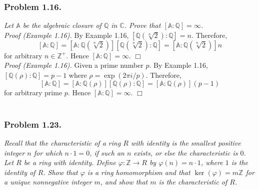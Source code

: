 \documentclass{article}
\begin{document}



\subsubsection*{Problem 1.16.}
\emph{Let $\mathbb{A}$ be the algebraic closure of $\mathbb{Q}$ in $\mathbb{C}$.
Prove that $[\mathbb{A}:\mathbb{Q}] = \infty$. } \\

\emph{Proof (Example 1.16).}
By Example 1.16, $[\mathbb{Q}(\sqrt[n]{2}):\mathbb{Q}] = n.$
Therefore,
$$[\mathbb{A}:\mathbb{Q}]
= [\mathbb{A}:\mathbb{Q}(\sqrt[n]{2})][\mathbb{Q}(\sqrt[n]{2}):\mathbb{Q}]
= [\mathbb{A}:\mathbb{Q}(\sqrt[n]{2})]n$$
for arbitrary $n \in \mathbb{Z}^+$.
Hence $[\mathbb{A}:\mathbb{Q}] = \infty$.
$\Box$ \\

\emph{Proof (Example 1.16).}
Given a prime number $p$.
By Example 1.16, $[\mathbb{Q}(\rho):\mathbb{Q}] = p-1$
where $\rho = \exp(2\pi i/p)$.
Therefore,
$$[\mathbb{A}:\mathbb{Q}]
= [\mathbb{A}:\mathbb{Q}(\rho)][\mathbb{Q}(\rho):\mathbb{Q}]
= [\mathbb{A}:\mathbb{Q}(\rho)](p-1)$$
for arbitrary prime $p$.
Hence $[\mathbb{A}:\mathbb{Q}] = \infty$.
$\Box$ \\\\






\subsubsection*{Problem 1.23.}
\emph{Recall that the characteristic of a ring $R$ with identity
is the smallest positive integer $n$ for which $n \cdot 1 = 0$,
if such an $n$ exists, or else the characteristic is $0$.
Let $R$ be a ring with identity.
Define $\varphi: \mathbb{Z} \rightarrow R$ by $\varphi(n) = n \cdot 1$,
where $1$ is the identity of $R$.
Show that $\varphi$ is a ring homomorphism
and that $\ker(\varphi) = m\mathbb{Z}$ for a unique nonnegative integer $m$,
and show that $m$ is the characteristic of $R$.} \\
\end{document}

